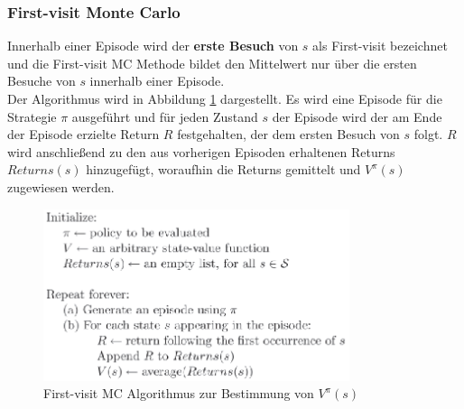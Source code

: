 \documentclass[10pt]{scrartcl}
\begin{document}
\subsubsection{First-visit Monte Carlo}
Innerhalb einer Episode wird der \textbf{erste Besuch} von $s$ als First-visit bezeichnet und die First-visit MC Methode bildet den Mittelwert nur über die ersten Besuche von $s$ innerhalb einer Episode.\\
Der Algorithmus wird in Abbildung \ref{fig:FirstVisit} dargestellt. Es wird eine Episode für die Strategie $\pi$ ausgeführt und für jeden Zustand $s$ der Episode wird der am Ende der Episode erzielte Return $R$ festgehalten, der dem ersten Besuch von $s$ folgt. $R$ wird anschließend zu den aus vorherigen Episoden erhaltenen Returns $Returns(s)$ hinzugefügt, woraufhin die Returns gemittelt und $V^{\pi}(s)$ zugewiesen werden.

\begin{figure}[htbp]
	\centering	\includegraphics[width=0.8\textwidth]{Bilder/First-visit_MC.png}
	\caption{First-visit MC Algorithmus zur Bestimmung von $V^{\pi}(s)$}
	\label{fig:FirstVisit}
\end{figure}
\end{document}
